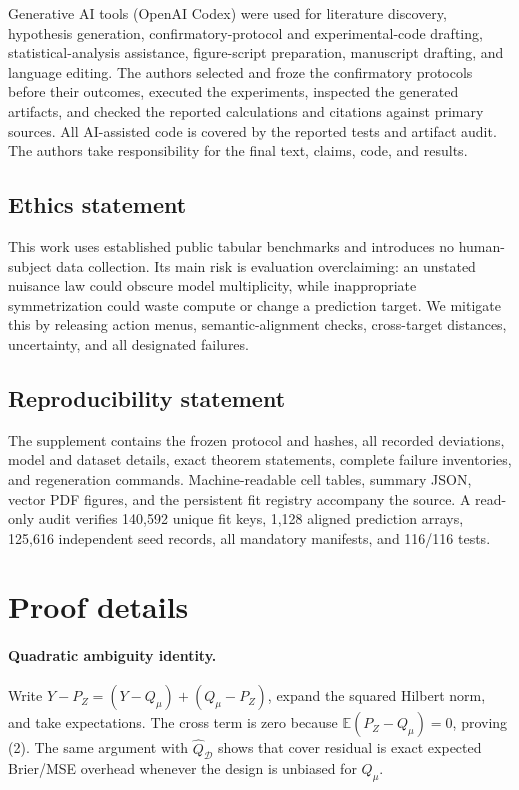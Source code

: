 \documentclass{article}
\newcommand{\E}{\mathbb{E}}
\newcommand{\Qhat}{\widehat{Q}}
\begin{document}
Generative AI tools (OpenAI Codex) were used for literature discovery,
hypothesis generation, confirmatory-protocol and experimental-code drafting,
statistical-analysis assistance, figure-script preparation, manuscript
drafting, and language editing. The authors selected and froze the
confirmatory protocols before their outcomes, executed the experiments,
inspected the generated artifacts, and checked the reported calculations and
citations against primary sources. All AI-assisted code is covered by the
reported tests and artifact audit. The authors take responsibility for the
final text, claims, code, and results.

\subsection*{Ethics statement}

This work uses established public tabular benchmarks and introduces no human-
subject data collection. Its main risk is evaluation overclaiming: an
unstated nuisance law could obscure model multiplicity, while inappropriate
symmetrization could waste compute or change a prediction target. We mitigate
this by releasing action menus, semantic-alignment checks, cross-target
distances, uncertainty, and all designated failures.

\subsection*{Reproducibility statement}

The supplement contains the frozen protocol and hashes, all recorded
deviations, model and dataset details, exact theorem statements, complete
failure inventories, and regeneration commands. Machine-readable cell tables,
summary JSON, vector PDF figures, and the persistent fit registry accompany
the source. A read-only audit verifies 140,592 unique fit keys, 1,128 aligned
prediction arrays, 125,616 independent seed records, all mandatory manifests,
and 116/116 tests.




\appendix
\section{Proof details}

\paragraph{Quadratic ambiguity identity.}
Write $Y-P_Z=(Y-Q_\mu)+(Q_\mu-P_Z)$, expand the squared Hilbert norm, and take
expectations. The cross term is zero because $\E(P_Z-Q_\mu)=0$, proving (2).
The same argument with $\Qhat_{\mathcal D}$ shows that cover residual is exact
expected Brier/MSE overhead whenever the design is unbiased for $Q_\mu$.
\end{document}
